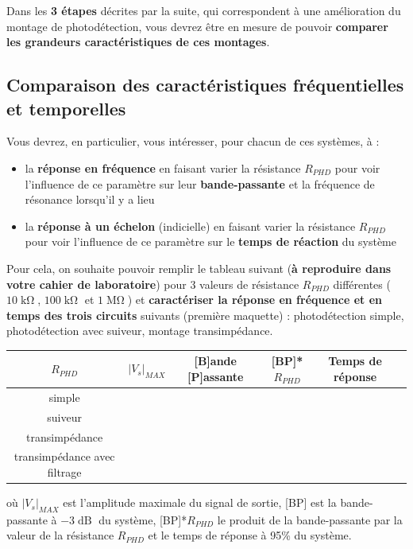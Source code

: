 Dans les \textbf{3 étapes} décrites par la suite, qui correspondent à une amélioration du montage de photodétection, vous devrez être en mesure de pouvoir \textbf{comparer les grandeurs caractéristiques de ces montages}.

\subsection{Comparaison des caractéristiques fréquentielles et temporelles}

Vous devrez, en particulier, vous intéresser, pour chacun de ces systèmes, à :

\begin{itemize}
	\item la \textbf{réponse en fréquence} en faisant varier la résistance $R_{PHD}$ pour voir l'influence de ce paramètre sur leur \textbf{bande-passante} et la fréquence de résonance lorsqu'il y a lieu
	\item la \textbf{réponse à un échelon} (indicielle) en faisant varier la résistance $R_{PHD}$ pour voir l'influence de ce paramètre sur le \textbf{temps de réaction} du système
\end{itemize} 

\medskip

Pour cela, on souhaite pouvoir remplir le tableau suivant (\textbf{à reproduire dans votre cahier de laboratoire}) pour 3 valeurs de résistance $R_{PHD}$ différentes ($10\operatorname{k\Omega}$, $100\operatorname{k\Omega}$ et $1\operatorname{M\Omega}$) et \textbf{caractériser la réponse en fréquence et en temps des trois circuits} suivants (première maquette) : photodétection simple, photodétection avec suiveur, montage transimpédance.

\medskip

\begin{center}
\begin{tabular}{|c|c|c|c|c|c|}
  \hline
  $R_{PHD}$ & $|V_s|_{MAX}$ & [B]ande [P]assante & [BP]*$R_{PHD}$ & Temps de réponse\\
  \hline
  simple & & & & \\
  \hline
  suiveur & & & & \\
  \hline
  transimpédance & & & & \\
  \hline
  transimpédance avec filtrage & & & & \\
  \hline
\end{tabular}
\end{center}

où $|V_s|_{MAX}$ est l'amplitude maximale du signal de sortie, [BP] est la bande-passante à $-3\operatorname{dB}$ du système, [BP]*$R_{PHD}$ le produit de la bande-passante par la valeur de la résistance $R_{PHD}$ et le temps de réponse à 95\% du système.

